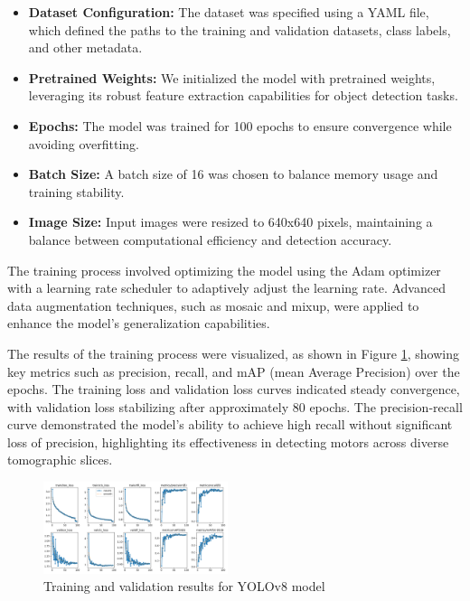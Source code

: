 \documentclass{article}
\begin{document}
\begin{itemize}
    \item \textbf{Dataset Configuration:} The dataset was specified using a YAML file, which defined the paths to the training and validation datasets, class labels, and other metadata.
    \item \textbf{Pretrained Weights:} We initialized the model with pretrained weights, leveraging its robust feature extraction capabilities for object detection tasks.
    \item \textbf{Epochs:} The model was trained for 100 epochs to ensure convergence while avoiding overfitting.
    \item \textbf{Batch Size:} A batch size of 16 was chosen to balance memory usage and training stability.
    \item \textbf{Image Size:} Input images were resized to 640x640 pixels, maintaining a balance between computational efficiency and detection accuracy.
\end{itemize}

The training process involved optimizing the model using the Adam optimizer with a learning rate scheduler to adaptively adjust the learning rate. Advanced data augmentation techniques, such as mosaic and mixup, were applied to enhance the model's generalization capabilities.

The results of the training process were visualized, as shown in Figure \ref{fig:yolo_training_results}, showing key metrics such as precision, recall, and mAP (mean Average Precision) over the epochs. The training loss and validation loss curves indicated steady convergence, with validation loss stabilizing after approximately 80 epochs. The precision-recall curve demonstrated the model's ability to achieve high recall without significant loss of precision, highlighting its effectiveness in detecting motors across diverse tomographic slices.

\begin{figure}[htb]
    \centering
    \includegraphics[width=0.48\textwidth]{images/results.png}
    \caption{Training and validation results for YOLOv8 model}
    \label{fig:yolo_training_results}
\end{figure}
\end{document}
